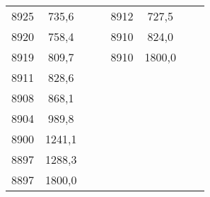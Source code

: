 \documentclass[11pt]{article}
\begin{document}
{{\begin{tabular}{|c|c|c|c|c|c|c|c|}
            8925 & 735,6 & \multicolumn{1}{c}{} &  & 8912 & 727,5 &  & \tabularnewline
            \cline{1-2} \cline{5-6} 
            8920 & 758,4 & \multicolumn{1}{c}{} &  & 8910 & 824,0 &  & \tabularnewline
            \cline{1-2} \cline{5-6} 
            8919 & 809,7 & \multicolumn{1}{c}{} &  & 8910 & 1800,0 &  & \tabularnewline
            \cline{1-2} \cline{5-6} 
            8911 & 828,6 & \multicolumn{1}{c}{} & \multicolumn{1}{c}{} & \multicolumn{1}{c}{} & \multicolumn{1}{c}{} &  & \tabularnewline
            \cline{1-2} 
            8908 & 868,1 & \multicolumn{1}{c}{} & \multicolumn{1}{c}{} & \multicolumn{1}{c}{} & \multicolumn{1}{c}{} &  & \tabularnewline
            \cline{1-2} 
            8904 & 989,8 & \multicolumn{1}{c}{} & \multicolumn{1}{c}{} & \multicolumn{1}{c}{} & \multicolumn{1}{c}{} &  & \tabularnewline
            \cline{1-2} 
            8900 & 1241,1 & \multicolumn{1}{c}{} & \multicolumn{1}{c}{} & \multicolumn{1}{c}{} & \multicolumn{1}{c}{} &  & \tabularnewline
            \cline{1-2} 
            8897 & 1288,3 & \multicolumn{1}{c}{} & \multicolumn{1}{c}{} & \multicolumn{1}{c}{} & \multicolumn{1}{c}{} &  & \tabularnewline
            \cline{1-2} 
            8897 & 1800,0 & \multicolumn{1}{c}{} & \multicolumn{1}{c}{} & \multicolumn{1}{c}{} & \multicolumn{1}{c}{} &  & \tabularnewline
            \cline{1-2} 
        \end{tabular}
    }
}
\vspace*{\fill}\vspace*{\fill}
\end{document}
